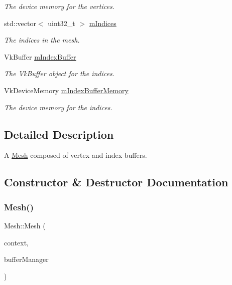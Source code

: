\begin{DoxyCompactItemize}
\begin{DoxyCompactList}\small\item\em The device memory for the vertices. \end{DoxyCompactList}\item 
\mbox{\label{class_mesh_a18a52fd32c77e52d3e27a47256b01b17}} 
std\+::vector$<$ uint32\+\_\+t $>$ \mbox{\hyperlink{class_mesh_a18a52fd32c77e52d3e27a47256b01b17}{m\+Indices}}
\begin{DoxyCompactList}\small\item\em The indices in the mesh. \end{DoxyCompactList}\item 
\mbox{\label{class_mesh_a864eb17a88cae48a17a0b324f8c2335a}} 
Vk\+Buffer \mbox{\hyperlink{class_mesh_a864eb17a88cae48a17a0b324f8c2335a}{m\+Index\+Buffer}}
\begin{DoxyCompactList}\small\item\em The Vk\+Buffer object for the indices. \end{DoxyCompactList}\item 
\mbox{\label{class_mesh_ae41ea253fa1d822d176f86b68db8b6ed}} 
Vk\+Device\+Memory \mbox{\hyperlink{class_mesh_ae41ea253fa1d822d176f86b68db8b6ed}{m\+Index\+Buffer\+Memory}}
\begin{DoxyCompactList}\small\item\em The device memory for the indices. \end{DoxyCompactList}\end{DoxyCompactItemize}


\subsection{Detailed Description}
A \mbox{\hyperlink{class_mesh}{Mesh}} composed of vertex and index buffers. 

\subsection{Constructor \& Destructor Documentation}
\mbox{\label{class_mesh_a3d6d629589f4450a0d865175313ca589}} 
\subsubsection{\texorpdfstring{Mesh()}{Mesh()}}
{\footnotesize\ttfamily Mesh\+::\+Mesh (\begin{DoxyParamCaption}\item[{std\+::shared\+\_\+ptr$<$ \mbox{\hyperlink{class_vulkan_context}{Vulkan\+Context}} $>$}]{context,  }\item[{std\+::shared\+\_\+ptr$<$ \mbox{\hyperlink{class_buffer_manager}{Buffer\+Manager}} $>$}]{buffer\+Manager }\end{DoxyParamCaption})}



